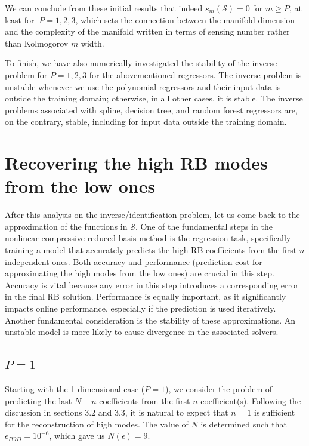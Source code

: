 \documentclass[graybox]{svmult}
\begin{document}
We can conclude from these initial results that indeed $s_m({\mathcal S}) = 0$ for $m \geq P$, at least for $\ P=1,2,3$, which sets the connection between the manifold dimension and the complexity of the manifold written in terms of sensing number rather than Kolmogorov $m$ width.

To finish, we have also numerically investigated the stability of the inverse problem for $P=1,2,3$ for the abovementioned regressors. The inverse problem is unstable whenever we use the polynomial regressors and their input data is outside the training domain; otherwise, in all other cases, it is stable. The inverse problems associated with spline, decision tree, and random forest regressors are, on the contrary, stable, including for input data outside the training domain. 

\section{Recovering the high RB modes from the low ones}
\label{sec:4}
After this analysis on the inverse/identification problem, let us come back to the approximation of the functions in ${\mathcal S}$. One of the fundamental steps in the nonlinear compressive reduced basis method is the regression task, specifically training a model that accurately predicts the high RB coefficients from the first $n$ independent ones. Both accuracy and performance (prediction cost for approximating the high modes from the low ones) are crucial in this step. Accuracy is vital because any error in this step introduces a corresponding error in the final RB solution. Performance is 
equally important, as it significantly impacts online performance, especially if the prediction is used iteratively. Another fundamental consideration is the stability of these approximations. An unstable model is more likely to cause divergence in the associated solvers.


\subsection{$P=1$}
\label{subsec:4.1}
Starting with the 1-dimensional case ($P=1$), we consider the problem of predicting the last $N-n$ coefficients from the first $n$ coefficient(s). Following the discussion in sections 3.2 and 3.3, it is natural to expect that $n=1$ is sufficient for the reconstruction of high modes. The value of $N$ is determined such that $\epsilon_{POD} = 10^{-6}$, which gave us $N(\epsilon) = 9$.
\end{document}
